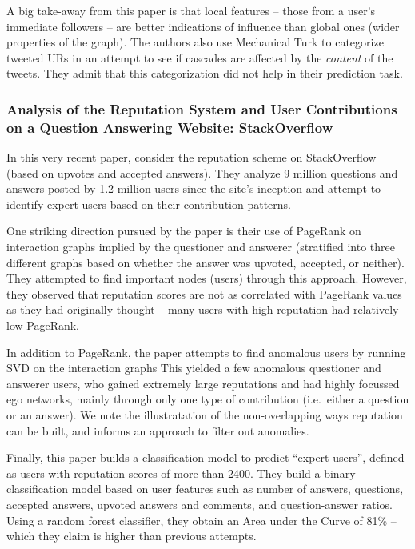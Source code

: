 \documentclass[10pt]{article}
\begin{document}
A big take-away from this paper is that local features -- those from a user's
immediate followers -- are better indications of influence than global ones
(wider properties of the graph). The authors also use Mechanical Turk to
categorize tweeted URs in an attempt to see if cascades are affected by the
\textit{content} of the tweets. They admit that this categorization did not help
in their prediction task. 

\subsubsection{Analysis of the Reputation System and User Contributions on a
  Question Answering Website: StackOverflow
  \citep{movshovitzanalysis}}

In this very recent paper, \citet{movshovitzanalysis} consider the reputation
scheme on StackOverflow (based on upvotes and accepted answers). They analyze 9
million questions and answers posted by 1.2 million users since the site's
inception and attempt to identify expert users based on their contribution
patterns.

One striking direction pursued by the paper is their use of PageRank on
interaction graphs implied by the questioner and answerer (stratified into three
different graphs based on whether the answer was upvoted, accepted, or neither).
They attempted to find important nodes (users) through this approach. However,
they observed that reputation scores are not as correlated with PageRank values
as they had originally thought -- many users with high reputation had
relatively low PageRank.

In addition to PageRank, the paper attempts to find anomalous users by running
SVD on the interaction graphs This yielded a few anomalous questioner and
answerer users, who gained extremely large reputations and had highly focussed
ego networks, mainly through only one type of contribution (i.e.\ either a
question or an answer). We note the illustratation of the non-overlapping ways
reputation can be built, and informs an approach to filter out anomalies.

Finally, this paper builds a classification model to predict ``expert users'',
defined as users with reputation scores of more than 2400. They build a
binary classification model based on user features such as number of answers,
questions, accepted answers, upvoted answers and comments, and question-answer
ratios. Using a random forest classifier, they obtain an Area
under the Curve of 81\% -- which they claim is higher than previous attempts.
\end{document}
